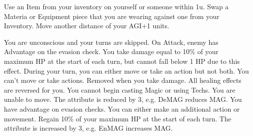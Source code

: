 \documentclass[a4paper, titlepage, 11pt, twocolumn] {article}
\begin{document}
{\begin{multicols}{2}
{		 Use an Item from your inventory on yourself or someone within 1u.\ofrow
		 Swap a Materia or Equipment piece that you are wearing against one from your Inventory.\ofrow
		 Move another distance of your AGI+1 units.
	}
	\columnbreak\\
	\parbox{1.03\columnwidth}{
		\scriptsize	
		\ofrow
		 You are unconscious and your turns are skipped.\ofrow
		 On Attack, enemy has Advantage on the evasion check. \ofrow
		 You take damage equal to 10\% of your maximum HP at the start of each turn, but cannot fall below 1 HP due to this effect.\ofrow
		 During your turn, you can either move or take an action but not both.\ofrow
		 You can't move or take actions. Removed when you take damage.\ofrow
		 All healing effects are reversed for you.\ofrow
		 You cannot begin casting Magic or using Techs.\ofrow
		 You are unable to move. \ofrow
		 The attribute is reduced by 3, e.g. DeMAG reduces MAG. \ofrow
		 You have advantage on evasion checks. \ofrow
		 You can either make an additional action or movement. \ofrow
		 Regain 10\% of your maximum HP at the start of each turn.\ofrow
		 The attribute is increased by 3, e.g. EnMAG increases MAG.
	}
	\end{multicols}
}
\end{document}
